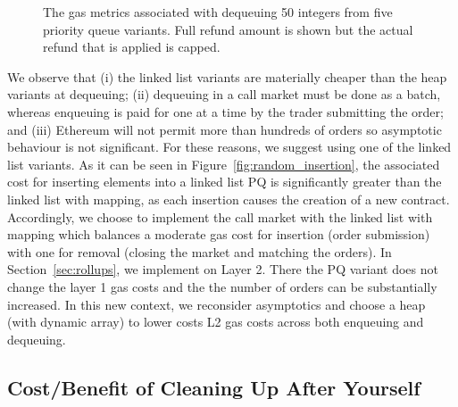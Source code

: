 \begin{figure}[t]
\begin{floatrow}
{\begin{tabular}{|>{\centering}m{2cm} |>{\centering}m{1.15cm} |>{\centering}m{1.15cm} |>{\centering\arraybackslash}m{0.2cm}|}
\end{tabular}
}{%
 \caption{\footnotesize{The gas metrics associated with dequeuing 50 integers from five priority queue variants. Full refund amount is shown but the actual refund that is applied is capped.}
\label{tab:PQUnitTests}}%
}
\end{floatrow}
\end{figure}









We observe that (i) the linked list variants are materially cheaper than the heap variants at dequeuing; (ii) dequeuing in a call market must be done as a batch, whereas enqueuing is paid for one at a time by the trader submitting the order; and (iii) Ethereum will not permit more than hundreds of orders so asymptotic behaviour is not significant. For these reasons, we suggest using one of the linked list variants. As it can be seen in Figure~\ref{fig:random_insertion}, the associated cost for inserting elements into a linked list PQ is significantly greater than the linked list with mapping, as each insertion causes the creation of a new contract. Accordingly, we choose to implement the call market with the linked list with mapping which balances a moderate gas cost for insertion (\ie order submission) with one for removal (\ie closing the market and matching the orders). In Section~\ref{sec:rollups}, we implement \cm on Layer 2. There the PQ variant does not change the layer 1 gas costs and the the number of orders can be substantially increased. In this new context, we reconsider asymptotics and choose a heap (with dynamic array) to lower costs L2 gas costs across both enqueuing and dequeuing.


\subsection{Cost/Benefit of Cleaning Up After Yourself}
\label{sec:gasrefund}



